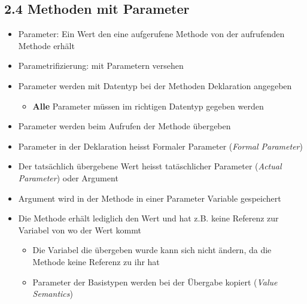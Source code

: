 \documentclass[11pt]{article}
\begin{document}
\subsection{2.4 Methoden mit Parameter}
\label{sec:orgff2dd8e}
\begin{itemize}
\item Parameter: Ein Wert den eine aufgerufene Methode von der aufrufenden Methode erhält\\
\item Parametrifizierung: mit Parametern versehen\\
\item Parameter werden mit Datentyp bei der Methoden Deklaration angegeben\\
\begin{itemize}
\item \textbf{Alle} Parameter müssen im richtigen Datentyp gegeben werden\\
\end{itemize}
\item Parameter werden beim Aufrufen der Methode übergeben\\
\item Parameter in der Deklaration heisst Formaler Parameter (\emph{Formal Parameter})\\
\item Der tatsächlich übergebene Wert heisst tatäschlicher Parameter (\emph{Actual Parameter}) oder Argument\\
\item Argument wird in der Methode in einer Parameter Variable gespeichert\\
\item Die Methode erhält lediglich den Wert und hat z.B. keine Referenz zur Variabel von wo der Wert kommt\\
\begin{itemize}
\item Die Variabel die übergeben wurde kann sich nicht ändern, da die Methode keine Referenz zu ihr hat\\
\item Parameter der Basistypen werden bei der Übergabe kopiert (\emph{Value Semantics})\\
\end{itemize}
\end{itemize}
\end{document}
